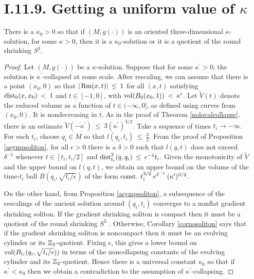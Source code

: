 \section{I.11.9. Getting a uniform value of $\kappa$}
\label{secI.11.9}


\begin{proposition}
  \label{prop:kl-getting-uniform-value-existence-kappa-solutions}
 \label{propI.11.9}
There is a $\kappa_0 > 0$ so that if $(M, g(\cdot))$ is an oriented
three-dimensional $\kappa$-solution, for some
$\kappa > 0$, then it is a $\kappa_0$-solution or
it is a quotient of the round shrinking $S^3$.
\end{proposition}
\begin{proof}
Let $(M, g(\cdot))$ be a $\kappa$-solution.
Suppose that for some $\kappa^\prime>0$,
the solution is $\kappa^\prime$-collapsed at some scale.
After
rescaling, we can assume that there is a point $(x_0, 0)$ so that
$|\operatorname{Rm}(x, t)| \: \le \: 1$ for all $(x, t)$ satisfying
$\operatorname{dist}_0(x, x_0) \: < \: 1$ and $t \in [-1, 0]$, with
$\operatorname{vol}(B_0(x_0, 1)) \: < \: \kappa^\prime$.  Let $\widetilde{V}(t)$ denote
the reduced volume as a function of $t \in (- \infty, 0]$, as
defined using curves from $(x_0, 0)$. It is nondecreasing in $t$.
As in the proof of Theorem \ref{nolocalcollapse}, there is an estimate
$\widetilde{V}(-\kappa^\prime) \: \le \: 3 (\kappa^\prime)^{3/2}$. Take a sequence
of times $t_i \rightarrow - \infty$. For each $t_i$, choose $q_i \in M$
so that $l(q_i, t_i) \: \le \: \frac{3}{2}$. From the proof of Proposition
\ref{asympsoliton}, for all $\epsilon > 0$
there is a $\delta > 0$ such that $l(q, t)$
does not exceed $\delta^{-1}$ whenever $t \in [t_i, t_i/2]$ and
$\operatorname{dist}_{t_i}^2(q, q_i) \: \le \: \epsilon^{-1} t_i$. Given the
monotonicity of $\widetilde{V}$ and the upper bound on $l(q,t)$,
we obtain an upper bound on the volume of the time-$t_i$ ball
$B(q_i, \sqrt{t_i/\epsilon})$ of the form $\operatorname{const.} \: t_i^{3/2} \:
e^{\delta^{-1}} \: (\kappa^\prime)^{3/2}$.

On the other hand, from
Proposition \ref{asympsoliton}, a subsequence of the rescalings
of the ancient solution around $(q_i, t_i)$ converges to a nonflat
gradient shrinking soliton.  If the gradient shrinking soliton is compact
then it must be a quotient of the round shrinking $S^3$
\cite{Hamiltonnnnn}. Otherwise,
Corollary \ref{cornosoliton} says that if the gradient shrinking soliton is
noncompact then it must be an evolving cylinder or its
${\mathbb Z}_2$-quotient.  Fixing $\epsilon$, this gives a lower bound on
$\operatorname{vol}(B_{t_i} (q_i, \sqrt{t_i/\epsilon}))$ in terms of the noncollapsing
constants of the evolving cylinder and its ${\mathbb Z}_2$-quotient. Hence there
is a universal constant $\kappa_0$ so that if
$\kappa^\prime<\kappa_0$ then we obtain a contradiction to the
assumption of $\kappa^\prime$-collapsing.
\end{proof}
